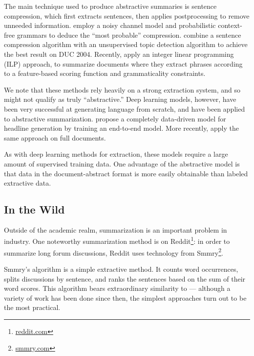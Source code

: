 \documentclass[12pt]{report}
\begin{document}
The main technique used to produce abstractive summaries is sentence compression, which first extracts sentences, then applies postprocessing to remove unneeded information.
 \citet{knight2002summarization} employ a noisy channel model and probabilistic context-free grammars to deduce the ``most probable'' compression.
\citet{zajic2004topiary} combine a sentence compression algorithm with an unsupervised topic detection algorithm to achieve the best result on DUC 2004.
Recently, \citet{Durrett2016} apply an integer linear programming (ILP) approach, to summarize documents where they extract phrases according to a feature-based scoring function and grammaticality constraints.


We note that these methods rely heavily on a strong extraction system, and so might not qualify as truly ``abstractive.'' Deep learning models, however, have been very successful at generating language from scratch, and have been applied to abstractive summarization. \citet{rush2015neural} propose a completely data-driven model for headline generation by training an end-to-end model. More recently, \citet{nallapati2016seq2seq} apply the same approach on full documents.

As with deep learning methods for extraction, these models require a large amount of supervised training data. One advantage of the abstractive model is that data in the document-abstract format is more easily obtainable than labeled extractive data.


\subsection{In the Wild}

Outside of the academic realm, summarization is an important problem in industry. One noteworthy summarization method is on Reddit\footnote{\url{reddit.com}}: in order to summarize long forum discussions, Reddit uses technology from Smmry\footnote{\url{smmry.com}}.

Smmry's algorithm is a simple extractive method. It counts word occurrences, splits discussions by sentence, and ranks the sentences based on the sum of their word scores. This algorithm bears extraordinary similarity to \citet{luhn1958automatic} --- although a variety of work has been done since then, the simplest approaches turn out to be the most practical.
\end{document}
